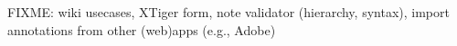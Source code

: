 
FIXME: wiki usecases, XTiger form, note validator (hierarchy, syntax), import
annotations from other (web)apps (e.g., Adobe)
